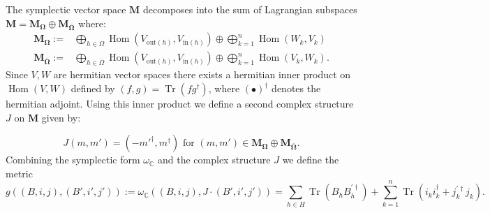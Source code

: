 \documentclass[12pt,oneside,reqno]{amsart}
\theoremstyle{definition}
\numberwithin{equation}{section}
\numberwithin{theorem}{section}
\newcommand{\C}{\mathbb{C}}
\renewcommand{\d}[1]{\ensuremath{\operatorname{d}\!{#1}}}
\newcommand{\Tr}{\operatorname{Tr}}
\newcommand{\Hom}{\operatorname{Hom}}
\renewcommand{\d}{\dagger}
\begin{document}
The symplectic vector space $\mathbf{M}$ decomposes into the sum of Lagrangian subspaces $\mathbf{M}=\mathbf{M_\Omega}\oplus \mathbf{M_{\bar \Omega}}$ where:
%
\begin{equation*}
    \begin{split}
        \mathbf{M_\Omega}:=&\bigoplus _{h \in \Omega}\Hom (V_{\text{out}(h)},V_{\text{in}(h)})\oplus \bigoplus_ {k=1}^n \Hom(W_k,V_k) \\
        \mathbf{M_{\bar \Omega}}:=&\bigoplus _{h \in \bar \Omega}\Hom (V_{\text{out}(h)},V_{\text{in}(h)})\oplus \bigoplus _{k=1}^n \Hom(V_k,W_k).
    \end{split}
\end{equation*}
%
Since $V,W$ are hermitian vector spaces there exists a hermitian inner product on $\Hom(V,W)$ defined by $(f,g)=\Tr(fg^\d)$, where $(\bullet)^\d$ denotes the hermitian adjoint. Using this inner product we define a second complex structure $J$ on $\mathbf{M}$ given by:

%
\begin{equation*}
J(m,m')=({-m'}^\d,m^\d) \text{ for } (m,m')\in\mathbf{M_\Omega}\oplus \mathbf{M_{\bar \Omega}}.
\end{equation*}
%
Combining the symplectic form $\omega_{\C}$ and the complex structure $J$ we define the metric 
%
\begin{equation}\label{Qmetric}
g((B,i,j),(B',i',j')) := \omega_{\C}((B,i,j),J\cdot(B',i',j')) = \sum\limits_{h\in H} \Tr(B_hB_h^{'\dagger}) + \sum\limits_{k=1}^n \Tr(i_k i_k^{\dagger} + j_k^{'\dagger}j_k).
\end{equation}
%
\end{document}
